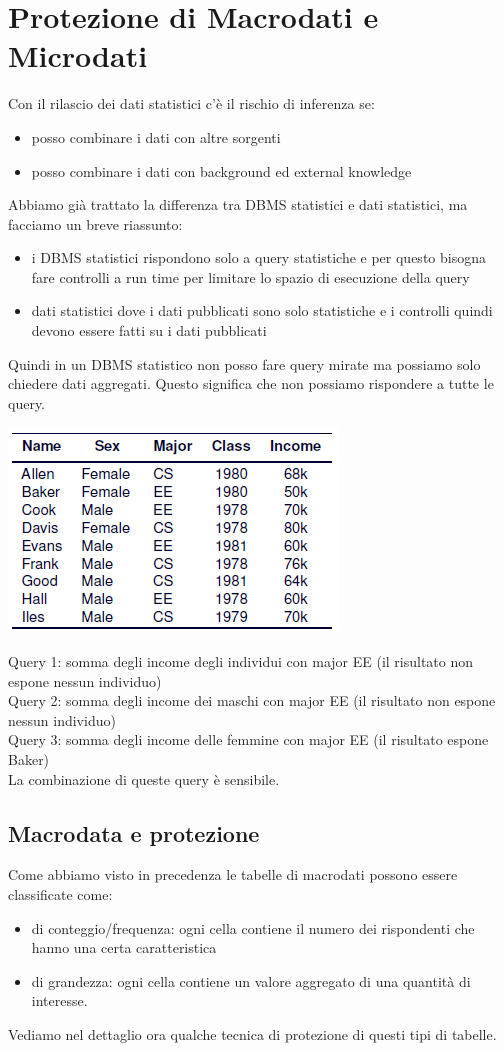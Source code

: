 \section{Protezione di Macrodati e Microdati}
Con il rilascio dei dati statistici c'è il rischio di inferenza se:
\begin{itemize}
    \item posso combinare i dati con altre sorgenti
    \item posso combinare i dati con background ed external knowledge
\end{itemize}
Abbiamo già trattato la differenza tra DBMS statistici e dati statistici, ma facciamo un breve riassunto:
\begin{itemize}
    \item i DBMS statistici rispondono solo a query statistiche e per questo bisogna fare controlli a run time per limitare lo spazio di esecuzione della query
    \item dati statistici dove i dati pubblicati sono solo statistiche e i controlli quindi devono essere fatti su i dati pubblicati
\end{itemize}

Quindi in un DBMS statistico non posso fare query mirate ma possiamo solo chiedere dati aggregati. Questo significa che non possiamo rispondere a tutte le query.
\begin{center}
    \includegraphics[scale=0.6]{img/statdbms.png}
\end{center}
Query 1: somma degli income degli individui con major EE (il risultato non espone nessun individuo)\\
Query 2: somma degli income dei maschi con major EE (il risultato non espone nessun individuo)\\
Query 3: somma degli income delle femmine con major EE (il risultato espone Baker)\\
La combinazione di queste query è sensibile.

\subsection{Macrodata e protezione}
Come abbiamo visto in precedenza le tabelle di macrodati possono essere classificate come:
\begin{itemize}
    \item di conteggio/frequenza: ogni cella contiene il numero dei rispondenti che hanno una certa caratteristica
    \item di grandezza: ogni cella contiene un valore aggregato di una quantità di interesse.
\end{itemize}
Vediamo nel dettaglio ora qualche tecnica di protezione di questi tipi di tabelle.

